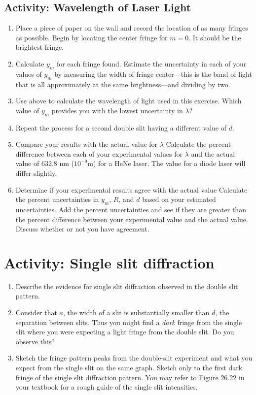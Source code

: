 \subsection{Activity: Wavelength of Laser Light}
\begin{enumerate}[resume]
	 \item 	Place a piece of paper on the wall and record the location of as many fringes as possible.  Begin by locating the center fringe for $m=0$.  It should be the brightest fringe.
	 \item Calculate $y_{m}$ for each fringe found.  Estimate the uncertainty in each of your values of $y_{m}$ by measuring the width of fringe center---this is the band of light that is all approximately at the same brightness---and dividing by two. 
	 \item Use  above to calculate the wavelength of light used in this exercise.  Which value of $y_{m}$ provides you with the lowest uncertainty in $\lambda$?
	 \item Repeat the process for a second double slit having a different value of $d$.
	 \item Compare your results with the actual value for $\lambda$
	Calculate the percent difference between each of your experimental values for $\lambda$ and the actual value of 632.8 nm ($10^{-9}$m) for a HeNe laser. The value for a diode laser will differ slightly.
	\item Determine if your experimental results agree with the actual value
	Calculate the percent uncertainties in $y_{m}$, $R$, and $d$ based on your estimated uncertainties.  Add the percent uncertainties and see if they are greater than the percent difference between your experimental value and the actual value.  Discuss whether or not you have agreement.
\end{enumerate}

\section{Activity: Single slit diffraction}
	 
	\begin{enumerate}[resume]
	\item Describe the evidence for single slit diffraction observed in the double slit pattern. 
	\item Consider that $a$, the width of a slit is substantially smaller than $d$, the separation between slits.  Thus you might find a \textit{dark} fringe from the single slit where you were expecting a light fringe from the double slit.  Do you observe this?
	\item Sketch the fringe pattern peaks from the double-slit experiment and what you expect from the single slit on the same graph.  Sketch only to the first dark fringe of the single slit diffraction pattern.  You may refer to Figure 26.22 in your textbook for a rough guide of the single slit intensities.  
	\end{enumerate}

